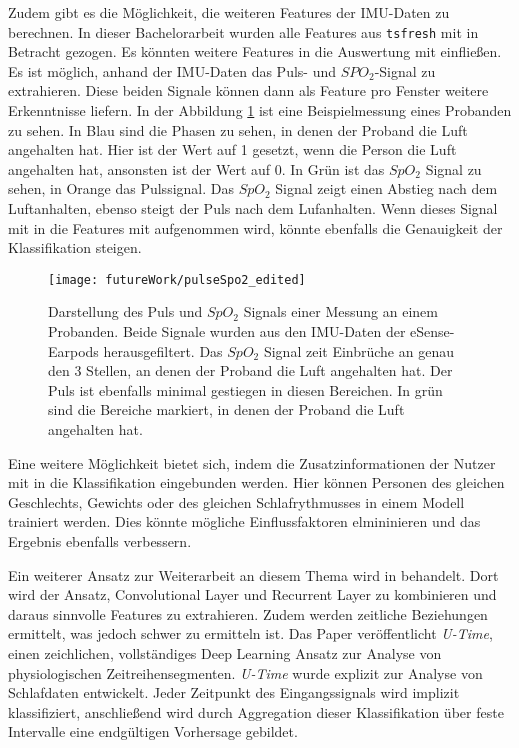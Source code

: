Zudem gibt es die Möglichkeit, die weiteren Features der IMU-Daten zu berechnen.
In dieser Bachelorarbeit wurden alle Features aus \texttt{tsfresh} mit in Betracht gezogen. 
Es könnten weitere Features in die Auswertung mit einfließen.
Es ist möglich, anhand der IMU-Daten das Puls- und $SPO_2$-Signal zu extrahieren. 
Diese beiden Signale können dann als Feature pro Fenster weitere Erkenntnisse liefern.
In der Abbildung \ref{futureWork:pulseSpo2} ist eine Beispielmessung eines Probanden zu sehen. 
In Blau sind die Phasen zu sehen, in denen der Proband die Luft angehalten hat.
Hier ist der Wert auf 1 gesetzt, wenn die Person die Luft angehalten hat, ansonsten ist der Wert auf 0. 
In Grün ist das $SpO_2$ Signal zu sehen, in Orange das Pulssignal. 
Das $SpO_2$ Signal zeigt einen Abstieg nach dem Luftanhalten, ebenso steigt der Puls nach dem Lufanhalten.
Wenn dieses Signal mit in die Features mit aufgenommen wird, könnte ebenfalls die Genauigkeit der Klassifikation steigen. 
\begin{figure}[ht]
    \centering
    \texttt{[image: futureWork/pulseSpo2\_edited]}
    \caption{Darstellung des Puls und $SpO_2$ Signals einer Messung an einem Probanden. Beide Signale wurden aus den IMU-Daten der eSense-Earpods herausgefiltert. Das $SpO_2$ Signal zeit Einbrüche an genau den 3 Stellen, an denen der Proband die Luft angehalten hat. Der Puls ist ebenfalls minimal gestiegen in diesen Bereichen. In grün sind die Bereiche markiert, in denen der Proband die Luft angehalten hat.}
    \label{futureWork:pulseSpo2}
\end{figure}

Eine weitere Möglichkeit bietet sich, indem die Zusatzinformationen der Nutzer mit in die Klassifikation eingebunden werden.
Hier können Personen des gleichen Geschlechts, Gewichts oder des gleichen Schlafrythmusses in einem Modell trainiert werden.
Dies könnte mögliche Einflussfaktoren elmininieren und das Ergebnis ebenfalls verbessern.

Ein weiterer Ansatz zur Weiterarbeit an diesem Thema wird in \cite{perslevUTimeFullyConvolutional2019} behandelt.
Dort wird der Ansatz, Convolutional Layer und Recurrent Layer zu kombinieren und daraus sinnvolle Features zu extrahieren. 
Zudem werden zeitliche Beziehungen ermittelt, was jedoch schwer zu ermitteln ist. 
Das Paper veröffentlicht \textit{U-Time}, einen zeichlichen, vollständiges Deep Learning Ansatz zur Analyse von physiologischen Zeitreihensegmenten. 
\textit{U-Time} wurde explizit zur Analyse von Schlafdaten entwickelt.
Jeder Zeitpunkt des Eingangssignals wird implizit klassifiziert, anschließend wird durch Aggregation dieser Klassifikation über feste Intervalle eine endgültigen Vorhersage gebildet.